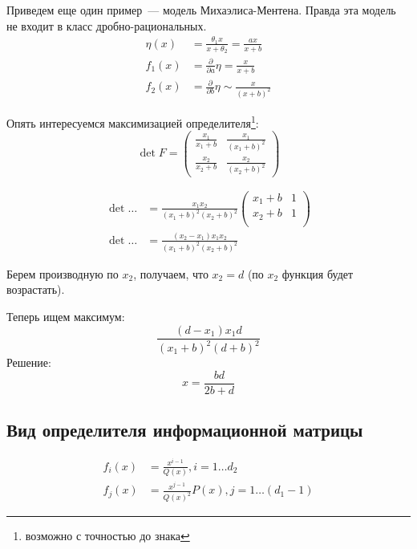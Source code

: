 \begin{ex}
Приведем еще один пример — модель Михаэлиса-Ментена. Правда эта модель не входит в класс дробно-рациональных.
\begin{equation}
\label{michelMentenModel}
\begin{split}
\eta(x) &= \frac{\theta_1 x}{x+\theta_2} = \frac{ax}{x+b}\\
f_1(x) &= \frac{\partial}{\partial{a}}\eta=\frac{x}{x+b} \\
f_2(x) &= \frac{\partial}{\partial{b}}\eta \sim \frac{x}{(x+b)^2}
\end{split}
\end{equation}

Опять интересуемся максимизацией определителя\footnote{возможно с точностью до знака}:
\begin{equation}
\det F = \begin{pmatrix}
\frac{x_1}{x_1+b} & \frac{x_1}{(x_1+b)^2} \\
\frac{x_2}{x_2+b} & \frac{x_2}{(x_2+b)^2} 
\end{pmatrix}
\end{equation}

\begin{align}
\det … &= \frac{x_1x_2}{(x_1+b)^2(x_2+b)^2}\begin{pmatrix} 
x_1 + b & 1 \\
x_2 + b & 1 \\
\end{pmatrix}\\
\det … &= \frac{(x_2 - x_1) x_1 x_2}{(x_1 + b)^2 (x_2 + b)^2}
\end{align}

Берем производную по $x_2$, получаем, что $x_2 = d$ (по $x_2$ функция будет возрастать).

Теперь ищем максимум:
\begin{equation}
\frac{(d - x_1) x_1 d}{(x_1 + b)^2 (d + b)^2}
\end{equation}
Решение: 
$$x = \frac{bd}{2b + d}$$
\end{ex}


\subsection{Вид определителя информационной матрицы}

\begin{align}
f_i(x) &= \frac{x^{i-1}}{Q(x)}, i =1 … d_2 \\
f_{j}(x) &= \frac{x^{j-1}}{Q(x)^2}P(x), j = 1…(d_1-1)
\end{align}

